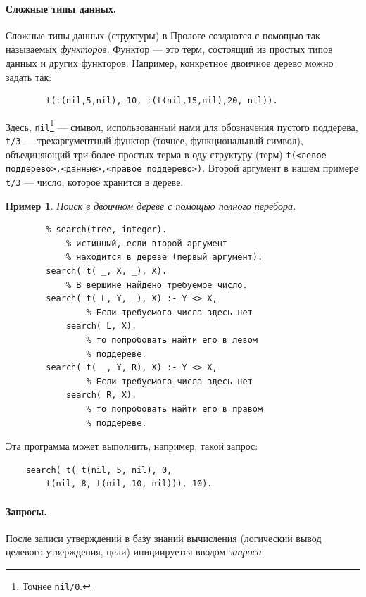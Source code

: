 \documentclass[12pt, openany, twoside]{book} %
\newtheorem{example}{Пример}[chapter]
\begin{document}
\paragraph{Сложные типы данных.}\label{sec:complex_data}
Сложные типы данных (структуры) в Прологе создаются с помощью так называемых {\em функторов}. Функтор --- это терм, состоящий из простых типов данных и других функторов. Например, конкретное двоичное дерево можно задать так:
{\tt\begin{verbatim}
        t(t(nil,5,nil), 10, t(t(nil,15,nil),20, nil)).
\end{verbatim}}
Здесь, \texttt{nil}\footnote{Точнее \texttt{nil/0}.} --- символ, использованный нами для обозначения пустого поддерева, \texttt{t/3} --- трехаргументный функтор (точнее, функциональный символ), объединяющий три более простых терма в оду структуру (терм) \texttt{t(<левое поддерево>,<данные>,<правое поддерево>)}. Второй аргумент в нашем примере \texttt{t/3} --- число, которое хранится в дереве.

\begin{example} Поиск в двоичном дереве с помощью полного перебора.
\label{ex:treesearch}
\end{example}
{\tt\begin{verbatim}
        % search(tree, integer).
            % истинный, если второй аргумент
            % находится в дереве (первый аргумент).
        search( t( _, X, _), X).
            % В вершине найдено требуемое число.
        search( t( L, Y, _), X) :- Y <> X,
                % Если требуемого числа здесь нет
            search( L, X).
                % то попробовать найти его в левом
                % поддереве.
        search( t( _, Y, R), X) :- Y <> X,
                % Если требуемого числа здесь нет
            search( R, X).
                % то попробовать найти его в правом
                % поддереве.

\end{verbatim}}
\noindent Эта программа может выполнить, например, такой запрос:
{\tt\begin{verbatim}
    search( t( t(nil, 5, nil), 0,
        t(nil, 8, t(nil, 10, nil))), 10).
\end{verbatim}}

\paragraph{Запросы.} После записи утверждений в базу знаний вычисления (логический вывод целевого утверждения, цели) инициируется вводом \emph{запроса}.
\end{document}
